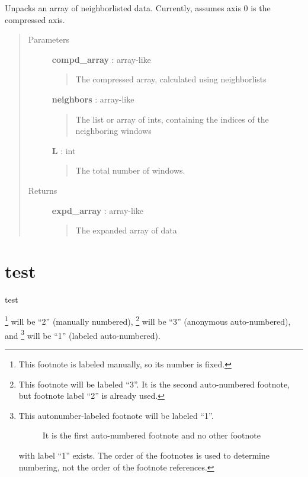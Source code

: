\documentclass[letterpaper,10pt,english]{sphinxmanual}
\begin{document}

\begin{fulllineitems}
\label{modules/usutils:usutils.unpackNbrs}
Unpacks an array of neighborlisted data.  Currently, assumes axis 0
is the compressed axis.
\begin{quote}\begin{description}
\item[{Parameters}] \leavevmode
\textbf{compd\_array} : array-like
\begin{quote}

The compressed array, calculated using neighborlists
\end{quote}

\textbf{neighbors} : array-like
\begin{quote}

The list or array of ints, containing the indices of the neighboring windows
\end{quote}

\textbf{L} : int
\begin{quote}

The total number of windows.
\end{quote}

\item[{Returns}] \leavevmode
\textbf{expd\_array} : array-like
\begin{quote}

The expanded array of data
\end{quote}

\end{description}\end{quote}

\end{fulllineitems}



\chapter{test}
\label{test:test}\label{test::doc}
test

\footnote{
This footnote is labeled manually, so its number is fixed.
} will be ``2'' (manually numbered),
\footnote{
This footnote will be labeled ``3''.  It is the second
auto-numbered footnote, but footnote label ``2'' is already used.
} will be ``3'' (anonymous auto-numbered), and
\footnote{\begin{description}
\item[{This autonumber-labeled footnote will be labeled ``1''.}] \leavevmode
It is the first auto-numbered footnote and no other footnote

\end{description}

with label ``1'' exists.  The order of the footnotes is used to
determine numbering, not the order of the footnote references.
} will be ``1'' (labeled auto-numbered).
\end{document}
